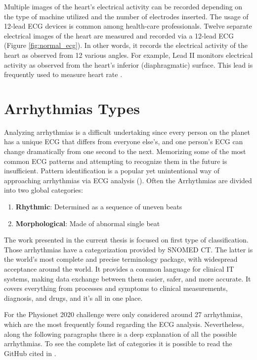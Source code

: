 Multiple images of the heart's electrical activity can be recorded depending on the type of machine utilized and the number of electrodes inserted. The usage of 12-lead ECG devices is common among health-care professionals. Twelve separate electrical images of the heart are measured and recorded via a 12-lead ECG (Figure \ref{fig:normal_ecg}). In other words, it records the electrical activity of the heart as observed from 12 various angles. For example, Lead II monitors electrical activity as observed from the heart's inferior (diaphragmatic) surface. This lead is frequently used to measure heart rate \cite{basic_arryth}.

\section{Arrhythmias Types} \label{arrhythmias_types}

Analyzing arrhythmias is a difficult undertaking since every person on the planet has a unique ECG that differs from everyone else's, and one person's ECG can change dramatically from one second to the next. Memorizing some of the most common ECG patterns and attempting to recognize them in the future is insufficient. Pattern identification is a popular yet unintentional way of approaching arrhythmias via ECG analysis (\cite{arryth_types}). Often the Arrhythmias are divided into two global categories:

\begin{enumerate}
    \item \textbf{Rhythmic}: Determined as a sequence of uneven beats
    \item \textbf{Morphological}: Made of abnormal single beat
\end{enumerate}

The work presented in the current thesis is focused on first type of classification. Those arrhythmias have a categorization provided by SNOMED CT. The latter is the world's most complete and precise terminology package, with widespread acceptance around the world. It provides a common language for clinical IT systems, making data exchange between them easier, safer, and more accurate. It covers everything from processes and symptoms to clinical measurements, diagnosis, and drugs, and it's all in one place.

For the Physionet 2020 challenge were only considered around 27 arrhythmias, which are the most frequently found regarding the ECG analysis. Nevertheless, along the following paragraphs there is a deep explanation of all the possible arrhythmias. To see the complete list of categories it is possible to read the GitHub cited in \cite{github_arrhythmias}.


